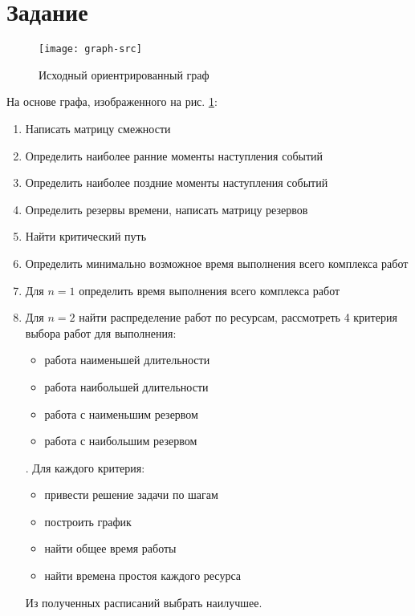 





\section{Задание}

\begin{figure}[H]
\begin{center}
	\texttt{[image: graph-src]}
	\caption{Исходный ориентрированный граф}
	\label{pic:graph-src}
\end{center}
\end{figure}

На основе графа, изображенного на рис. \ref{pic:graph-src}:

\begin{enumerate}
\item Написать матрицу смежности
\item Определить наиболее ранние моменты наступления событий
\item Определить наиболее поздние моменты наступления событий
\item Определить резервы времени, написать матрицу резервов
\item Найти критический путь
\item Определить минимально возможное время выполнения всего комплекса работ
\item Для $n = 1$ определить время выполнения всего комплекса работ
\item Для $n = 2$ найти распределение работ по ресурсам, рассмотреть 4 критерия выбора работ для выполнения: 
\begin{itemize}
\item работа наименьшей длительности
\item работа наибольшей длительности
\item работа с наименьшим резервом
\item работа с наибольшим резервом
\end{itemize}. 
Для каждого критерия:

\begin{itemize}
\item привести решение задачи по шагам
\item построить график
\item найти общее время работы
\item найти времена простоя каждого ресурса
\end{itemize}
Из полученных расписаний выбрать наилучшее.

\end{enumerate}

